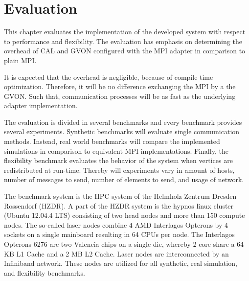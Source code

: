 \chapter{Evaluation}
\label{sec:evaluation}


This chapter evaluates the implementation of the developed
system with respect to performance and flexibility.  The
evaluation has emphasis on determining the overhead of CAL and GVON
configured with the MPI adapter in comparison to plain MPI.

It is expected that the overhead is negligible, because of compile
time optimization. Therefore, it will be no difference exchanging
the MPI by a the GVON. Such that, communication processes will
be as fast as the underlying adapter implementation.

The evaluation is divided in several benchmarks and every benchmark
provides several experiments. Synthetic benchmarks will evaluate
single communication methods. Instead, real world benchmarks
will compare the implemented simulations in comparison to equivalent
MPI implementations. Finally, the flexibility benchmark evaluates the
behavior of the system when vertices are redistributed at run-time.
Thereby will experiments vary in amount of hosts, number of messages
to send, number of elements to send, and usage of network.

The benchmark system is the HPC system of the Helmholz
Zentrum Dresden Rossendorf (HZDR)\cite{ref:hzdr_cluster}.
A part of the HZDR system is the hypnos linux cluster (Ubuntu 12.04.4
LTS) consisting of two head nodes and more than 150 compute nodes.
The so-called laser nodes combine 4 AMD Interlagos Opterons by 4
sockets on a single mainboard resulting in 64 CPUs per node.  The
Interlagos Opterons 6276 are two Valencia chips on a single die,
whereby 2 core share a 64 KB L1 Cache and a 2 MB L2 Cache. Laser nodes
are interconnected by an Infiniband network. These nodes are utilized
for all synthetic, real simulation, and flexibility benchmarks.

